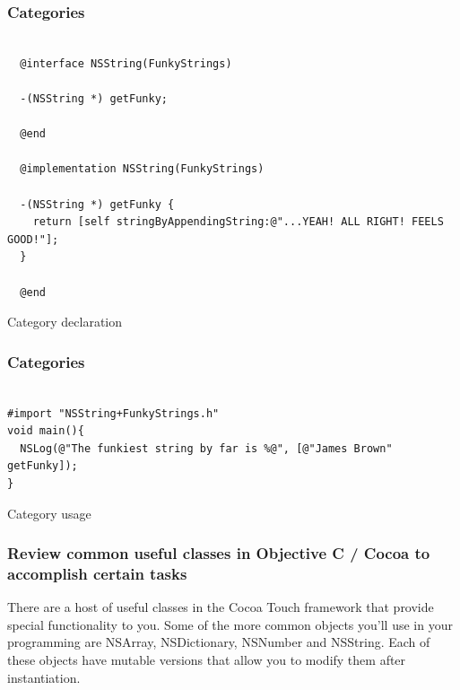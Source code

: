\documentclass[10pt]{beamer}
\begin{document}
\begin{frame}[fragile]
  \frametitle{Categories}
  \begin{listing}[H]
    \begin{verbatim}

  @interface NSString(FunkyStrings)

  -(NSString *) getFunky;

  @end

  @implementation NSString(FunkyStrings)

  -(NSString *) getFunky {
    return [self stringByAppendingString:@"...YEAH! ALL RIGHT! FEELS GOOD!"];
  }

  @end

  \end{verbatim}
    \caption{Category declaration}
    \label{listing:18}
  \end{listing}

\end{frame}

\begin{frame}[fragile]
  \frametitle{Categories}
  \begin{listing}[H]
  \begin{verbatim}

#import "NSString+FunkyStrings.h"
void main(){
  NSLog(@"The funkiest string by far is %@", [@"James Brown" getFunky]);
}
\end{verbatim}
  \caption{Category usage}
  \label{listing:19}
\end{listing}

\end{frame}

    
\begin{frame}[fragile]
  \frametitle{Review common useful classes in Objective C / Cocoa to accomplish certain tasks}
  There are a host of useful classes in the Cocoa Touch framework that provide special functionality to you.  Some of the more common objects you'll use in your programming are NSArray, NSDictionary, NSNumber and NSString.  Each of these objects have mutable versions that allow you to modify them after instantiation.

\end{frame}
\end{document}
